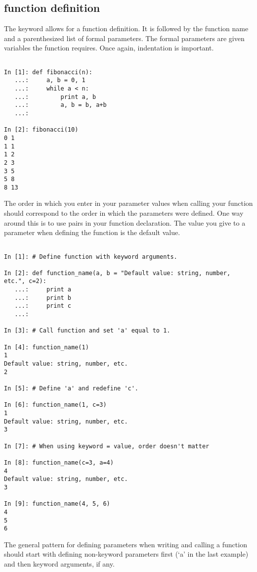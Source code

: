 \subsection*{function definition}
\begin{example}

The  keyword allows for a function definition. It is followed by 
the function name and a parenthesized list of formal parameters.
The formal parameters are given variables the function requires. 
Once again, indentation is important. 

\begin{lstlisting}

In [1]: def fibonacci(n):
   ...:     a, b = 0, 1
   ...:     while a < n:
   ...:         print a, b
   ...:         a, b = b, a+b
   ...:         

In [2]: fibonacci(10)
0 1
1 1
1 2
2 3
3 5
5 8
8 13

\end{lstlisting}

The order in which you enter in your parameter values when calling your function should correspond to the order in which the parameters were defined. One way around this is to use  pairs in your function declaration. The value you give to a parameter when defining the function is the default value.

\begin{lstlisting}

In [1]: # Define function with keyword arguments.

In [2]: def function_name(a, b = "Default value: string, number, etc.", c=2):
   ...:     print a
   ...:     print b
   ...:     print c
   ...:     

In [3]: # Call function and set 'a' equal to 1.

In [4]: function_name(1)
1
Default value: string, number, etc.
2

In [5]: # Define 'a' and redefine 'c'.

In [6]: function_name(1, c=3)
1
Default value: string, number, etc.
3

In [7]: # When using keyword = value, order doesn't matter

In [8]: function_name(c=3, a=4)
4
Default value: string, number, etc.
3

In [9]: function_name(4, 5, 6)
4
5
6

\end{lstlisting}

The general pattern for defining parameters when writing and calling a function should start with defining non-keyword parameters first (`a' in the last example) and then keyword arguments, if any.


\end{example}
